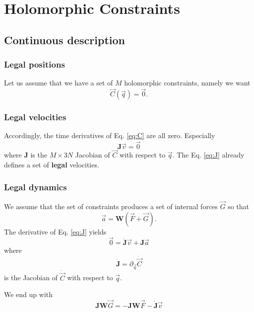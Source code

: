 \documentclass[aps,onecolumn]{revtex4}
\newcommand{\mymat}[1]{\boldsymbol{#1}}
\begin{document}
\section{Holomorphic Constraints}
\subsection{Continuous description}
\subsubsection{Legal positions}

Let us assume that we have a set of $M$ holomorphic constraints, namely we want
\begin{equation}
	\label{eq:C}
	\vec{C}\left(\vec{q}\right) = \vec{0}.
\end{equation}

\subsubsection{Legal velocities}
Accordingly, the time derivatives of Eq. \eqref{eq:C} are all zero.
Especially
\begin{equation}
	\label{eq:J}
	\mymat{J}\vec{v} = \vec{0}
\end{equation}
where $\mymat{J}$ is the $M\times 3N$ Jacobian of $\vec{C}$ with respect to $\vec{q}$.
The Eq. \eqref{eq:J} already defines a set of \textbf{legal} velocities.

\subsubsection{Legal dynamics}
We assume that the set of constraints produces a set of internal forces $\vec{G}$ so that
\begin{equation}
	\vec{a} = \mymat{W} \left( \vec{F} + \vec{G} \right).
\end{equation}
The derivative of Eq. \eqref{eq:J} yields
\begin{equation}
	\vec{0} = \dot{\mymat{J}}\vec{v} + \mymat{J}\vec{a}
\end{equation}
where
\begin{equation}
	\dot{\mymat{J}} = \partial_{\vec{q}} \dot{\vec{C}}
\end{equation}
is the Jacobian of $\dot{\vec{C}}$ with respect to $\vec{q}$.

We end up with
\begin{equation}
\label{eq:JW}
	\mymat{J}\mymat{W}\vec{G} = 
	-\mymat{J}\mymat{W}\vec{F} - \dot{\mymat{J}}\vec{v}
\end{equation}
\end{document}
